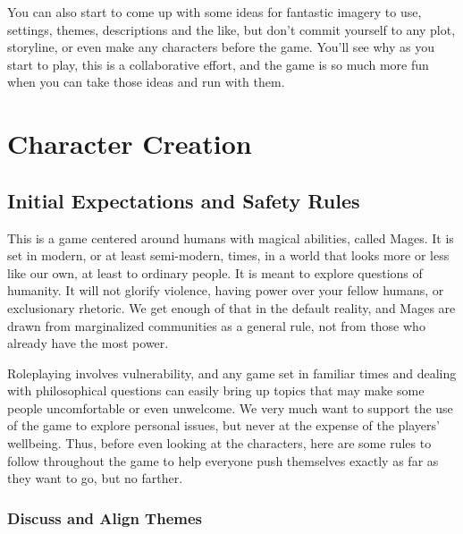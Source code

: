 \documentclass[
]{memoir}
\begin{document}
You can also start to come up with some ideas for fantastic imagery to
use, settings, themes, descriptions and the like, but don't commit
yourself to any plot, storyline, or even make any characters before the
game. You'll see why as you start to play, this is a collaborative
effort, and the game is so much more fun when you can take those ideas
and run with them.

\hypertarget{character-creation}{%
\section{Character Creation}\label{character-creation}}

\label{Safety Rules}

\hypertarget{initial-expectations-and-safety-rules}{%
\subsection{Initial Expectations and Safety
Rules}\label{initial-expectations-and-safety-rules}}

This is a game centered around humans with magical abilities, called
Mages. It is set in modern, or at least semi-modern, times, in a world
that looks more or less like our own, at least to ordinary people. It is
meant to explore questions of humanity. It will not glorify violence,
having power over your fellow humans, or exclusionary rhetoric. We get
enough of that in the default reality, and Mages are drawn from
marginalized communities as a general rule, not from those who already
have the most power.

Roleplaying involves vulnerability, and any game set in familiar times
and dealing with philosophical questions can easily bring up topics that
may make some people uncomfortable or even unwelcome. We very much want
to support the use of the game to explore personal issues, but never at
the expense of the players' wellbeing. Thus, before even looking at the
characters, here are some rules to follow throughout the game to help
everyone push themselves exactly as far as they want to go, but no
farther.

\hypertarget{discuss-and-align-themes}{%
\subsubsection{Discuss and Align
Themes}\label{discuss-and-align-themes}}
\end{document}
